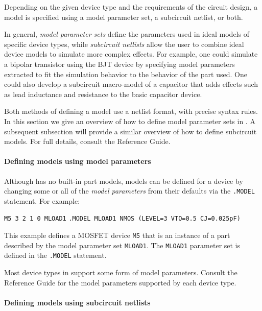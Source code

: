 Depending on the given device type and the requirements of the circuit
design, a model is specified using a model parameter set, a subcircuit
netlist, or both.

In general, {\em model parameter sets} define the parameters used in ideal
models of specific device types, while {\em subcircuit netlists} allow the user
to combine ideal device models to simulate more complex effects.  For example,
one could simulate a bipolar transistor using the \Xyce{} BJT device by specifying
model parameters extracted to fit the simulation behavior to the behavior of
the part used. One could also develop a subcircuit macro-model of a capacitor
that adds effects such as lead inductance and resistance to the basic capacitor
device.

Both methods of defining a model use a netlist format, with precise
syntax rules.  In this section we give an overview of how to define
model parameter sets in \Xyce{}.  A subsequent subsection will provide a
similar overview of how to define subcircuit models.  For full
details, consult the \Xyce{} Reference Guide\ReferenceGuide.

\paragraph{Defining models using model parameters}

Although \Xyce{} has no built-in part models,  models can be defined for a
device by changing some or all of the {\em model parameters} from their
defaults via the \texttt{.MODEL} statement. For example:

\begin{vquote}
 \texttt{M5 3 2 1 0 MLOAD1}
 \texttt{.MODEL MLOAD1 NMOS (LEVEL=3 VTO=0.5 CJ=0.025pF)}
\end{vquote}

This example defines a MOSFET device \texttt{M5} that is an instance of a part
described by the model parameter set \texttt{MLOAD1}.  The \texttt{MLOAD1}
parameter set is defined in the \texttt{.MODEL} statement.

Most device types in \Xyce{} support some form of model parameters.  Consult
the \Xyce{} Reference Guide\ReferenceGuide{} for the model parameters supported
by each device type.

\paragraph{Defining models using subcircuit netlists}

